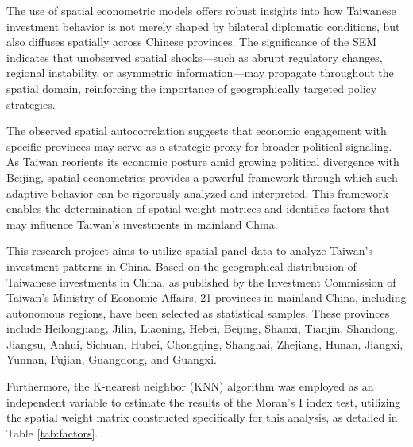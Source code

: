 \documentclass{article}
\begin{document}
The use of spatial econometric models offers robust insights into how Taiwanese investment behavior is not merely shaped by bilateral diplomatic conditions, but also diffuses spatially across Chinese provinces. The significance of the SEM indicates that unobserved spatial shocks—such as abrupt regulatory changes, regional instability, or asymmetric information—may propagate throughout the spatial domain, reinforcing the importance of geographically targeted policy strategies.

The observed spatial autocorrelation suggests that economic engagement with specific provinces may serve as a strategic proxy for broader political signaling. As Taiwan reorients its economic posture amid growing political divergence with Beijing, spatial econometrics provides a powerful framework through which such adaptive behavior can be rigorously analyzed and interpreted. This framework enables the determination of spatial weight matrices and identifies factors that may influence Taiwan’s investments in mainland China.

This research project aims to utilize spatial panel data to analyze Taiwan’s investment patterns in China. Based on the geographical distribution of Taiwanese investments in China, as published by the Investment Commission of Taiwan’s Ministry of Economic Affairs, 21 provinces in mainland China, including autonomous regions, have been selected as statistical samples. These provinces include Heilongjiang, Jilin, Liaoning, Hebei, Beijing, Shanxi, Tianjin, Shandong, Jiangsu, Anhui, Sichuan, Hubei, Chongqing, Shanghai, Zhejiang, Hunan, Jiangxi, Yunnan, Fujian, Guangdong, and Guangxi.

Furthermore, the K-nearest neighbor (KNN) algorithm was employed as an independent variable to estimate the results of the Moran’s I index test, utilizing the spatial weight matrix constructed specifically for this analysis, as detailed in Table \ref{tab:factors}.
\end{document}
